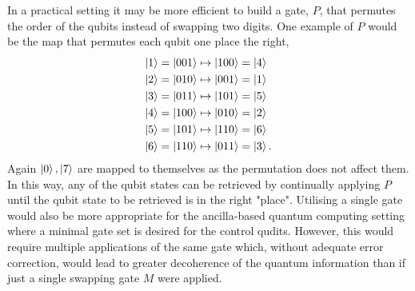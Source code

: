 In a practical setting it may be more efficient to build a gate, $P$, that permutes the order of the qubits instead of swapping two digits.
One example of $P$ would be the map that permutes each qubit one place the right,
\begin{align}
    \ket{1} = \ket{001} &\mapsto \ket{100} = \ket{4}\\
    \ket{2} = \ket{010} &\mapsto \ket{001} = \ket{1}\\
    \ket{3} = \ket{011} &\mapsto \ket{101} = \ket{5}\\
    \ket{4} = \ket{100} &\mapsto \ket{010} = \ket{2}\\
    \ket{5} = \ket{101} &\mapsto \ket{110} = \ket{6}\\
    \ket{6} = \ket{110} &\mapsto \ket{011} = \ket{3}.
\end{align}
Again $\ket{0}, \ket{7}$ are mapped to themselves as the permutation does not affect them.
In this way, any of the qubit states can be retrieved by continually applying $P$ until the qubit state to be retrieved is in the right "place".
Utilising a single gate would also be more appropriate for the ancilla-based quantum computing setting where a minimal gate set is desired for the control qudits.
However, this would require multiple applications of the same gate which, without adequate error correction, would lead to greater decoherence of the quantum information than if just a single swapping gate $M$ were applied.